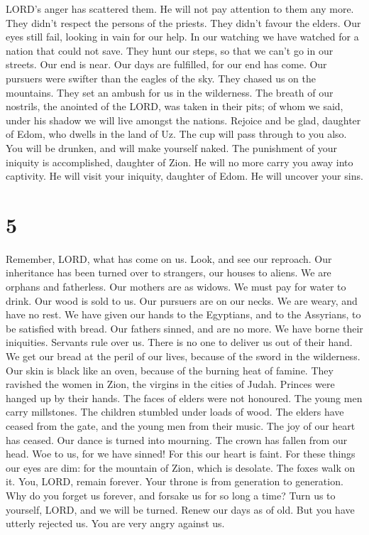 LORD's anger has scattered them. He will not pay attention to them any
more. They didn't respect the persons of the priests. They didn't favour
the elders.  Our eyes still fail, looking in vain for our
help. In our watching we have watched for a nation that could not save.
 They hunt our steps, so that we can't go in our streets.
Our end is near. Our days are fulfilled, for our end has come.
 Our pursuers were swifter than the eagles of the sky.
They chased us on the mountains. They set an ambush for us in the
wilderness.  The breath of our nostrils, the anointed of
the LORD, was taken in their pits; of whom we said, under his shadow we
will live amongst the nations.  Rejoice and be glad,
daughter of Edom, who dwells in the land of Uz. The cup will pass
through to you also. You will be drunken, and will make yourself naked.
 The punishment of your iniquity is accomplished,
daughter of Zion. He will no more carry you away into captivity. He will
visit your iniquity, daughter of Edom. He will uncover your sins.

\hypertarget{section-4}{%
\section{5}\label{section-4}}

 Remember, LORD, what has come on us. Look, and see our
reproach.  Our inheritance has been turned over to
strangers, our houses to aliens.  We are orphans and
fatherless. Our mothers are as widows.  We must pay for
water to drink. Our wood is sold to us.  Our pursuers are
on our necks. We are weary, and have no rest.  We have
given our hands to the Egyptians, and to the Assyrians, to be satisfied
with bread.  Our fathers sinned, and are no more. We have
borne their iniquities.  Servants rule over us. There is
no one to deliver us out of their hand.  We get our bread
at the peril of our lives, because of the sword in the wilderness.
 Our skin is black like an oven, because of the burning
heat of famine.  They ravished the women in Zion, the
virgins in the cities of Judah.  Princes were hanged up
by their hands. The faces of elders were not honoured. 
The young men carry millstones. The children stumbled under loads of
wood.  The elders have ceased from the gate, and the
young men from their music.  The joy of our heart has
ceased. Our dance is turned into mourning.  The crown has
fallen from our head. Woe to us, for we have sinned!  For
this our heart is faint. For these things our eyes are dim:
 for the mountain of Zion, which is desolate. The foxes
walk on it.  You, LORD, remain forever. Your throne is
from generation to generation.  Why do you forget us
forever, and forsake us for so long a time?  Turn us to
yourself, LORD, and we will be turned. Renew our days as of old.
 But you have utterly rejected us. You are very angry
against us.
